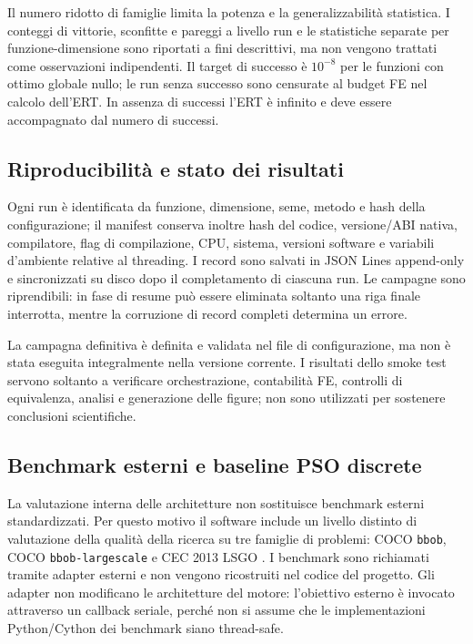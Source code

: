 Il numero ridotto di famiglie limita la potenza e la generalizzabilità statistica. I conteggi di vittorie, sconfitte e pareggi a livello run e le statistiche separate per funzione-dimensione sono riportati a fini descrittivi, ma non vengono trattati come osservazioni indipendenti. Il target di successo è $10^{-8}$ per le funzioni con ottimo globale nullo; le run senza successo sono censurate al budget FE nel calcolo dell'ERT. In assenza di successi l'ERT è infinito e deve essere accompagnato dal numero di successi.

\subsection{Riproducibilità e stato dei risultati}

Ogni run è identificata da funzione, dimensione, seme, metodo e hash della configurazione; il manifest conserva inoltre hash del codice, versione/ABI nativa, compilatore, flag di compilazione, CPU, sistema, versioni software e variabili d'ambiente relative al threading. I record sono salvati in JSON Lines append-only e sincronizzati su disco dopo il completamento di ciascuna run. Le campagne sono riprendibili: in fase di resume può essere eliminata soltanto una riga finale interrotta, mentre la corruzione di record completi determina un errore.

La campagna definitiva è definita e validata nel file di configurazione, ma non è stata eseguita integralmente nella versione corrente. I risultati dello smoke test servono soltanto a verificare orchestrazione, contabilità FE, controlli di equivalenza, analisi e generazione delle figure; non sono utilizzati per sostenere conclusioni scientifiche.


\subsection{Benchmark esterni e baseline PSO discrete}
\label{sec:external-benchmarks}

La valutazione interna delle architetture non sostituisce benchmark esterni
standardizzati. Per questo motivo il software include un livello distinto di
valutazione della qualità della ricerca su tre famiglie di problemi: COCO
\texttt{bbob}, COCO \texttt{bbob-largescale} e CEC 2013 LSGO
\citep{Hansen2021,Varelas2020,Li2013}. I benchmark sono richiamati tramite
adapter esterni e non vengono ricostruiti nel codice del progetto. Gli adapter
non modificano le architetture del motore: l'obiettivo esterno è invocato
attraverso un callback seriale, perché non si assume che le implementazioni
Python/Cython dei benchmark siano thread-safe.

